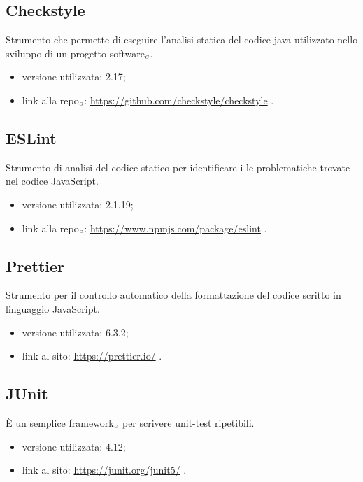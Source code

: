 \subsection{Checkstyle}\label{LibrerieCheckstyle}
Strumento che permette di eseguire l’analisi statica del codice java utilizzato nello sviluppo di un progetto software$_{\scaleto{G}{3pt}}$.

\begin{itemize}
  \item versione utilizzata: 2.17;
  \item link alla repo$_{\scaleto{G}{3pt}}$: \url{https://github.com/checkstyle/checkstyle} .
\end{itemize}

\subsection{ESLint}\label{LibrerieESLint}
Strumento di analisi del codice statico per identificare i le problematiche trovate nel codice JavaScript.

\begin{itemize}
  \item versione utilizzata: 2.1.19;
  \item link alla repo$_{\scaleto{G}{3pt}}$: \url{https://www.npmjs.com/package/eslint} .
\end{itemize}

\subsection{Prettier}\label{LibreriePrettier}
Strumento per il controllo automatico della formattazione del codice scritto in linguaggio JavaScript.

\begin{itemize}
  \item versione utilizzata: 6.3.2;
  \item link al sito: \url{https://prettier.io/} .
\end{itemize}

\subsection{JUnit}\label{LibrerieJUnit}
È un semplice framework$_{\scaleto{G}{3pt}}$ per scrivere unit-test ripetibili.

\begin{itemize}
  \item versione utilizzata: 4.12;
  \item link al sito: \url{https://junit.org/junit5/} .
\end{itemize}

